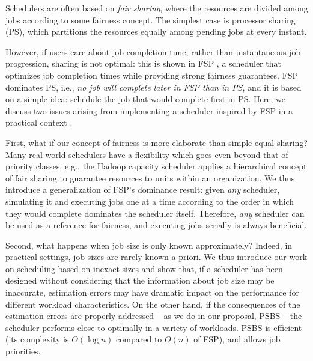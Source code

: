 \documentclass[11pt,oneside,english]{amsart}
\numberwithin{equation}{section}
\numberwithin{figure}{section}
\theoremstyle{definition}
\theoremstyle{plain}
\begin{document}
Schedulers are often based on \emph{fair sharing}, 
where the resources are divided
among jobs according to some fairness concept. The simplest case is
processor sharing (PS), which partitions the resources equally 
among pending jobs at every instant.
\begin{comment} ; many implementations are more complex: for
example, in the Hadoop capacity scheduler \cite{Zaharia2009} a
hierarchical concept of fair sharing is applied, to guarantee a given
amount of resources to units or departments within on organization,
and split excess resources again according to fairness concepts
\end{comment}
However, if users care about job completion time, 
rather than instantaneous job progression,
sharing is not optimal: this is shown in FSP \cite{
Friedman2003}, a scheduler that optimizes job completion times
while providing strong fairness guarantees. FSP dominates PS,
i.e., \emph{no job will complete later in FSP than in PS}, and it is 
based on a simple idea: schedule the job that would complete first 
in PS. Here, we discuss two issues arising from implementing a 
scheduler inspired by FSP in a practical context \cite{Pastorelli2013
}.  

First, what if our concept of fairness is more elaborate than simple
equal sharing? Many real-world schedulers have a flexibility which
goes even beyond that of priority classes: e.g., the Hadoop
capacity scheduler \cite{Zaharia2009} applies a hierarchical concept
of fair sharing to guarantee resources to units within an
organization. We thus introduce a generalization of FSP's dominance
result: given \emph{any} scheduler, simulating it and executing jobs
one at a time according to the order in which they would complete
dominates the scheduler itself. Therefore, \emph{any} scheduler can
be used as a reference for fairness, and executing jobs serially is
always beneficial.

Second, what happens when job size is only known approximately?
Indeed, in practical settings, job sizes are rarely known a-priori. 
We thus introduce our work on scheduling based on inexact sizes and 
show that, if a scheduler has been designed without considering that
the information about job size may be inaccurate, estimation errors 
may have dramatic impact on the performance for different 
workload characteristics. On the other hand, if
the consequences of the estimation errors are  
properly addressed -- as we do in our proposal,
PSBS \cite{DellAmico2014} -- the scheduler performs close to 
optimally in a variety of workloads. PSBS is efficient
(its complexity is $O\left(\log n\right)$ compared to $O\left(n\right)$
of FSP), and allows 
job priorities.
\end{document}
